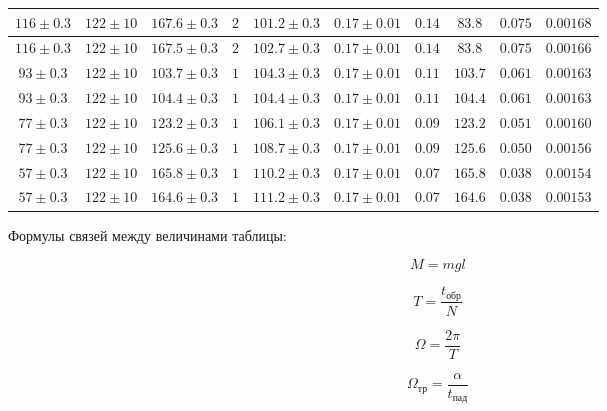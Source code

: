 \documentclass[a4paper]{article}
\begin{document}
\begin{table}[h!]
\begin{tabular}{|c|c|c|c|c|c|c|c|c|c|}
$116\pm{0.3}$  & $122\pm{10}$  & $167.6\pm{0.3}$ &  $2$ & $101.2\pm{0.3}$ & $0.17\pm{0.01}$ & $0.14$ & $83.8$ & $0.075$ & $0.00168$\\ \hline

$116\pm{0.3}$  & $122\pm{10}$  & $167.5\pm{0.3}$ &  $2$ & $102.7\pm{0.3}$ & $0.17\pm{0.01}$ & $0.14$ & $83.8$ & $0.075$ & $0.00166$\\ \hline

$93\pm{0.3}$  & $122\pm{10}$  & $103.7\pm{0.3}$ &  $1$ & $104.3\pm{0.3}$ & $0.17\pm{0.01}$ & $0.11$ & $103.7$ & $0.061$ & $0.00163$\\ \hline

$93\pm{0.3}$  & $122\pm{10}$  & $104.4\pm{0.3}$ &  $1$ & $104.4\pm{0.3}$ & $0.17\pm{0.01}$ & $0.11$ & $104.4$ & $0.061$ & $0.00163$\\ \hline

$77\pm{0.3}$  & $122\pm{10}$  & $123.2\pm{0.3}$ &  $1$ & $106.1\pm{0.3}$ & $0.17\pm{0.01}$ & $0.09$ & $123.2$ & $0.051$ & $0.00160$\\ \hline

$77\pm{0.3}$  & $122\pm{10}$  & $125.6\pm{0.3}$ &  $1$ & $108.7\pm{0.3}$ & $0.17\pm{0.01}$ & $0.09$ & $125.6$ & $0.050$ & $0.00156$\\ \hline

$57\pm{0.3}$  & $122\pm{10}$  & $165.8\pm{0.3}$ &  $1$ & $110.2\pm{0.3}$ & $0.17\pm{0.01}$ & $0.07$ & $165.8$ & $0.038$ & $0.00154$\\ \hline

$57\pm{0.3}$  & $122\pm{10}$  & $164.6\pm{0.3}$ &  $1$ & $111.2\pm{0.3}$ & $0.17\pm{0.01}$ & $0.07$ & $164.6$ & $0.038$ & $0.00153$\\ \hline

\end{tabular}
\end{table}


Формулы связей между величинами таблицы:

\begin{equation}
	M = mgl
\end{equation}

\begin{equation}
	T = \frac{t_\text{обр}}{N}
\end{equation}

\begin{equation}
	\Omega = \frac{2\pi}{T}
\end{equation}

\begin{equation}
	\Omega_\text{тр} = \frac{\alpha}{t_\text{пад}}
\end{equation}
\end{document}
